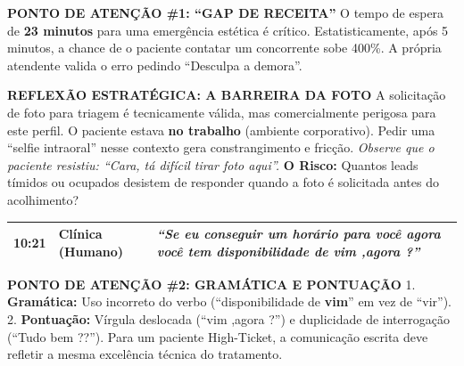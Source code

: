 \documentclass[a4paper,11pt]{article}
\begin{document}
\begin{tcolorbox}[colback=infoDentalOrange!5, colframe=infoDentalOrange, boxrule=0.5pt, arc=0mm, left=2mm, right=2mm]
    \textbf{\textcolor{infoDentalOrange}{PONTO DE ATENÇÃO \#1: ``GAP DE RECEITA''}}
    \footnotesize
    O tempo de espera de \textbf{23 minutos} para uma emergência estética é crítico. Estatisticamente, após 5 minutos, a chance de o paciente contatar um concorrente sobe 400\%. A própria atendente valida o erro pedindo ``Desculpa a demora''.
\end{tcolorbox}

\begin{tcolorbox}[colback=infoDentalTeal!5, colframe=infoDentalTeal, boxrule=0.5pt, arc=0mm, left=2mm, right=2mm]
    \textbf{\textcolor{infoDentalTeal}{REFLEXÃO ESTRATÉGICA: A BARREIRA DA FOTO}}
    \footnotesize
    A solicitação de foto para triagem é tecnicamente válida, mas comercialmente perigosa para este perfil.
    O paciente estava \textbf{no trabalho} (ambiente corporativo). Pedir uma ``selfie intraoral'' nesse contexto gera constrangimento e fricção.
    \textit{Observe que o paciente resistiu: ``Cara, tá difícil tirar foto aqui''.}
    \textbf{O Risco:} Quantos leads tímidos ou ocupados desistem de responder quando a foto é solicitada antes do acolhimento?
\end{tcolorbox}

\begin{tcolorbox}[enhanced, frame hidden, colback=white]
    \renewcommand{\arraystretch}{1.5}
    \begin{tabular}{ | p{} | p{} | p{} | }
        \hline
        \textbf{10:21} & Clínica (Humano) &
        \textit{``Se eu conseguir um horário para você agora você tem disponibilidade de vim ,agora ?''} \\
        \hline
    \end{tabular}
\end{tcolorbox}

\begin{tcolorbox}[colback=infoDentalOrange!5, colframe=infoDentalOrange, boxrule=0.5pt, arc=0mm, left=2mm, right=2mm]
    \textbf{\textcolor{infoDentalOrange}{PONTO DE ATENÇÃO \#2: GRAMÁTICA E PONTUAÇÃO}}
    \footnotesize
    1. \textbf{Gramática:} Uso incorreto do verbo (``disponibilidade de \textbf{vim}'' em vez de ``vir'').
    2. \textbf{Pontuação:} Vírgula deslocada (``vim ,agora ?'') e duplicidade de interrogação (``Tudo bem ??'').
    Para um paciente High-Ticket, a comunicação escrita deve refletir a mesma excelência técnica do tratamento.
\end{tcolorbox}
\end{document}
